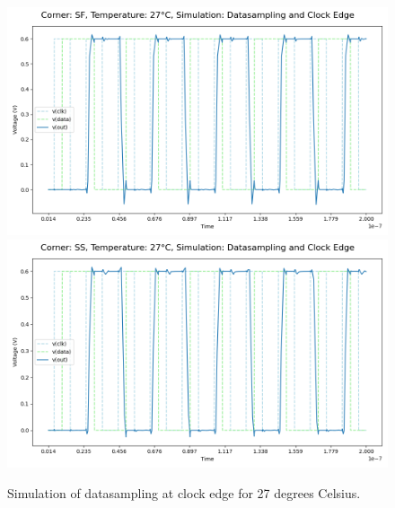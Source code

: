 \begin{figure}[H]
    \vspace{5pt}
    \includegraphics[height= 0.21\textheight]{figures/aimspice/SF/27/W1.csv.png}
    \vspace{5pt}
    \includegraphics[height= 0.21\textheight]{figures/aimspice/SS/27/W1.csv.png}
    \caption{Simulation of datasampling at clock edge for 27 degrees Celsius.}
    \label{fig:aimspice_W1_27}
\end{figure}

\pagebreak

